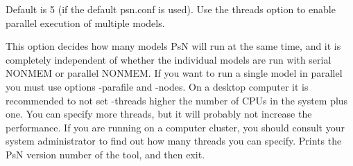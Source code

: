 \begin{optionlist}

Default is 5 (if the default psn.conf is used). Use the threads option to enable parallel execution of multiple models.

This option decides how many models PsN will run at the same time, and it is completely independent of whether the individual models are run with serial NONMEM or parallel NONMEM. If you want to run a single model in parallel you must use options -parafile and -nodes. On a desktop computer it is recommended to not set -threads higher the number of CPUs in the system plus one. 
You can specify more threads, but it will probably not increase the performance. If you are running on a computer cluster, you should consult your system administrator to find out how many threads you can specify. 
\nextopt
{}
Prints the PsN version number of the tool, and then exit. 
\nextopt
\end{optionlist}
